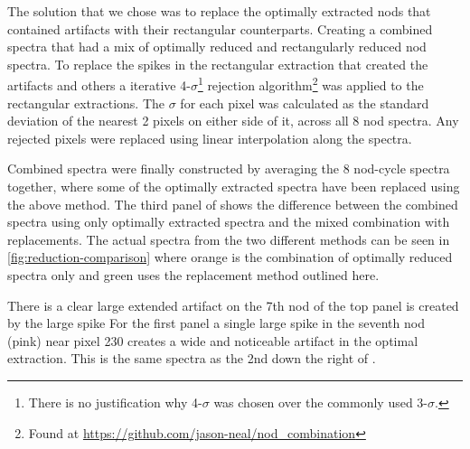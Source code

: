 The solution that we chose was to replace the optimally extracted nods that contained artifacts with their rectangular counterparts. Creating a combined spectra that had a mix of optimally reduced and rectangularly reduced nod spectra.
To replace the spikes in the rectangular extraction that created the artifacts and others a iterative 4-\(\sigma \)\footnote{There is no justification why 4-\(\sigma\) was chosen over the commonly used 3-\(\sigma\).} rejection algorithm\footnote{Found at \url{https://github.com/jason-neal/nod_combination}} was applied to the rectangular extractions. The \(\sigma\) for each pixel was calculated as the standard deviation of the nearest 2 pixels on either side of it, across all 8 nod spectra. Any rejected pixels were replaced using linear interpolation along the spectra.


Combined spectra were finally constructed by averaging the 8 nod-cycle spectra together, where some of the optimally extracted spectra have been replaced using the above method. The third panel of  shows the difference between the combined spectra using only optimally extracted spectra and the mixed combination with replacements. The actual spectra from the two different methods can be seen in \ref{fig:reduction-comparison} where orange is the combination of optimally reduced spectra only and green uses the replacement method outlined here.

There is a clear large extended artifact on the 7th nod of the top panel is created by the large spike For the first panel a single large spike in the seventh nod (pink) near pixel 230 creates a wide and noticeable artifact in the optimal extraction. This is the same spectra as the 2nd down the right of .


